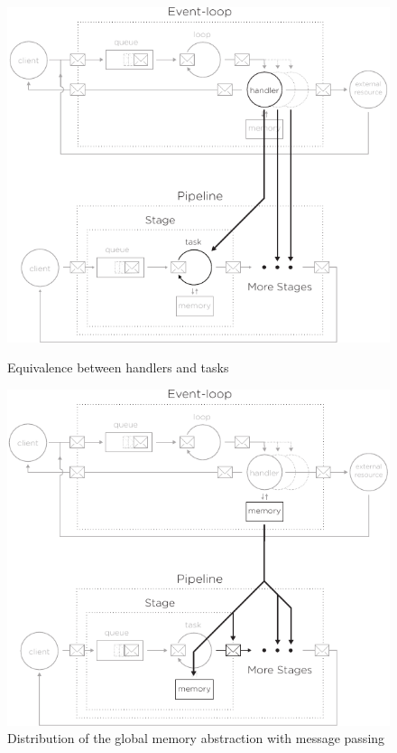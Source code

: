 \begin{figure}[h!]
  \begin{minipage}[t]{0.45\textwidth}
    \centering
    \includegraphics[width=\linewidth]{../resources/run-equivalence.pdf}
    \caption{Equivalence between handlers and tasks}
    \label{fig:run-equivalence}
  \end{minipage}
  \hfill
  \vrule
  \hfill
  \begin{minipage}[t]{0.45\textwidth}
    \centering
    \includegraphics[width=\linewidth]{../resources/mem-equivalence.pdf}
    \caption{Distribution of the global memory abstraction with message passing}
    \label{fig:mem-equivalence}
  \end{minipage}
\end{figure}



